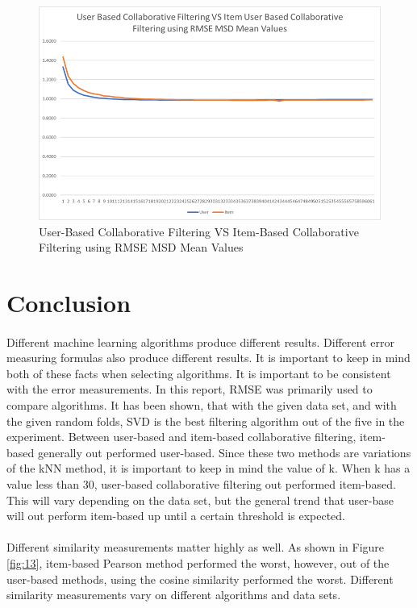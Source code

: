\documentclass[times]{article}
\begin{document}
		\begin{figure}
			\includegraphics[width=\linewidth]{Means.png}
			\caption{User-Based Collaborative Filtering VS Item-Based Collaborative Filtering using RMSE MSD Mean Values}
			\label{fig:means}
		\end{figure}


	\section{Conclusion}
		\paragraph{}
		Different machine learning algorithms produce different results. Different error measuring formulas also produce different results. It is important to keep in mind both of these facts when selecting algorithms. It is important to be consistent with the error measurements. In this report, RMSE was primarily used to compare algorithms. It has been shown, that with the given data set, and with the given random folds, SVD is the best filtering algorithm out of the five in the experiment. Between user-based and item-based collaborative filtering, item-based generally out performed user-based. Since these two methods are variations of the kNN method, it is important to keep in mind the value of k. When k has a value less than 30, user-based collaborative filtering out performed item-based. This will vary depending on the data set, but the general trend that user-base will out perform item-based up until a certain threshold is expected.
		\paragraph{}
		Different similarity measurements matter highly as well. As shown in Figure \ref{fig:13}, item-based Pearson method performed the worst, however, out of the user-based methods, using the cosine similarity performed the worst. Different similarity measurements vary on different algorithms and data sets. 
		
\end{document}
